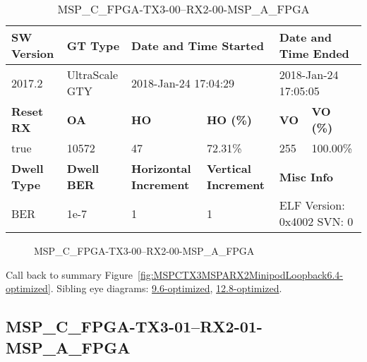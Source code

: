 \begin{table}[h]
\centering
\caption{MSP\_C\_FPGA-TX3-00--RX2-00-MSP\_A\_FPGA}
\label{tab:MSPCFPGATX300RX200MSPAFPGA6.4-optimized}
\begin{tabular}{@{}|l|l|l|l|l|l|@{}}
\toprule
\textbf{SW Version}                & \textbf{GT Type}   & \multicolumn{2}{l|}{\textbf{Date and Time Started}}            & \multicolumn{2}{l|}{\textbf{Date and Time Ended}}        \\ \midrule
2017.2                       & UltraScale GTY          & \multicolumn{2}{l|}{2018-Jan-24 17:04:29}                   & \multicolumn{2}{l|}{2018-Jan-24 17:05:05}               \\ \midrule
\textbf{Reset RX}                  & \textbf{OA} & \textbf{HO}   & \textbf{HO (\%)} & \textbf{VO} & \textbf{VO (\%)} \\ \midrule
true & 10572        & 47          & 72.31\%        & 255        & 100.00\%       \\ \midrule
\textbf{Dwell Type}                & \textbf{Dwell BER} & \textbf{Horizontal Increment} & \textbf{Vertical Increment}    & \multicolumn{2}{l|}{\textbf{Misc Info}}                  \\ \midrule
BER                            & 1e-7        & 1        & 1           & \multicolumn{2}{l|}{ELF Version: 0x4002 SVN: 0}                         \\ \bottomrule
\end{tabular}
\end{table}

\begin{figure}[h]
\caption{MSP\_C\_FPGA-TX3-00--RX2-00-MSP\_A\_FPGA} \label{fig:MSPCFPGATX300RX200MSPAFPGA6.4-optimized}
\end{figure}

Call back to summary Figure~\ref{fig:MSPCTX3MSPARX2MinipodLoopback6.4-optimized}.
Sibling eye diagrams: \hyperref[sec:MSPCFPGATX300RX200MSPAFPGA9.6-optimized]{9.6-optimized}, \hyperref[sec:MSPCFPGATX300RX200MSPAFPGA12.8-optimized]{12.8-optimized}.

\clearpage
\newpage


\subsection{MSP\_C\_FPGA-TX3-01--RX2-01-MSP\_A\_FPGA}\label{sec:MSPCFPGATX301RX201MSPAFPGA6.4-optimized}

